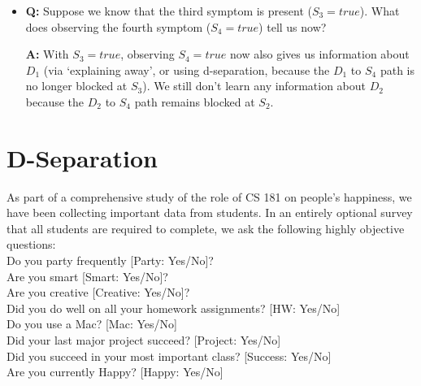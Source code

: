 \documentclass[11pt,letterpaper]{article}
\begin{document}
\begin{itemize}

\item \textbf{Q:} Suppose we know that the third symptom is present ($S_3= true$). What does observing the fourth symptom ($S_4= true$) tell us now? 

\begin{solution}
\textbf{A:} With $S_3= true$, observing $S_4=true$ now also gives us information about $D_1$ (via `explaining away', 
or using d-separation, because the $D_1$ to $S_4$ path is no longer blocked at $S_3$). We still don't learn
any information about $D_2$ because the $D_2$ to $S_4$ path remains blocked at $S_2$.
%
\end{solution}


\end{itemize}

\section{D-Separation}
As part of a comprehensive study of the role of CS 181 on people's happiness, we have been collecting important data from students. In an entirely optional survey that all students are required to complete, we ask the following highly objective questions: \\

Do you party frequently [Party: Yes/No]? \\
\indent Are you  smart [Smart: Yes/No]? \\
\indent Are you creative [Creative: Yes/No]? \\
\indent Did you do well on all your homework assignments? [HW: Yes/No] \\
\indent Do you use a Mac? [Mac: Yes/No] \\
\indent Did your last major project succeed? [Project: Yes/No] \\
\indent Did you succeed in your most important class? [Success: Yes/No] \\
\indent Are you currently Happy? [Happy: Yes/No] \\
\end{document}
